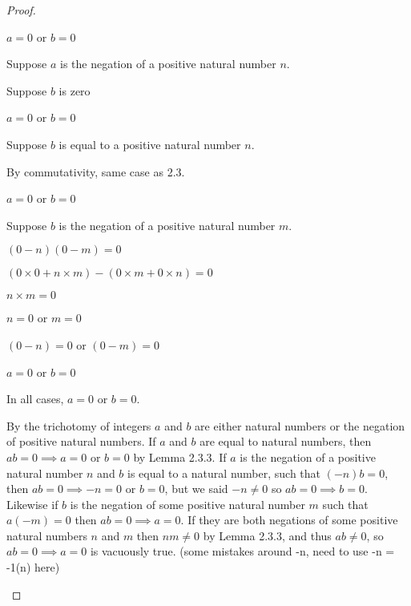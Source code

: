 \documentclass[../../main.tex]{subfiles}
\begin{document}
\begin{proof}
\begin{lxl}
\begin{lxl}
            \item $a = 0$ or $b = 0$  
        \end{lxl}
        \item Suppose $a$ is the negation of a positive natural number $n$.
        \begin{lxl}
            \item Suppose $b$ is zero
            \begin{lxl}
                \item $a = 0$ or $b = 0$
            \end{lxl}
            \item Suppose $b$ is equal to a positive natural number $n$.
            \begin{lxl}
                \item By commutativity, same case as 2.3. 
                \item $a = 0$ or $b = 0$
            \end{lxl}
            \item Suppose $b$ is the negation of a positive natural number $m$.
            \begin{lxl}
                \item $(0-n)(0-m)=0$
                \item $(0 \times 0 + n \times m)-(0 \times m + 0 \times n) = 0$
                \item $n \times m = 0$
                \item $n = 0$ or $m = 0$
                \item $(0 - n) = 0$ or $(0 - m) = 0$
                \item $a = 0$ or $b = 0$
            \end{lxl}
        \end{lxl}
    \end{lxl}
    In all cases, $a = 0$ or $b = 0$.
    
\begin{xx}
        By the trichotomy of integers $a$ and $b$ are either natural numbers or the negation of positive natural numbers. If $a$ and $b$ are equal to natural numbers, then $ab=0 \implies a=0$ or $b=0$ by Lemma 2.3.3. If $a$ is the negation of a positive natural number $n$ and $b$ is equal to a natural number, such that $(-n)b=0$, then $ab=0 \implies -n=0$ or $b=0$, but we said $-n \neq 0$ so $ab=0 \implies b=0$. Likewise if $b$ is the negation of some positive natural number $m$ such that $a(-m)=0$ then $ab=0 \implies a=0$. If they are both negations of some positive natural numbers $n$ and $m$ then $nm \neq 0$ by Lemma 2.3.3, and thus $ab \neq 0$, so $ab=0 \implies a=0$ is vacuously true. (some mistakes around -n, need to use -n = -1(n) here)
\end{xx}    
\end{proof}
\end{document}
